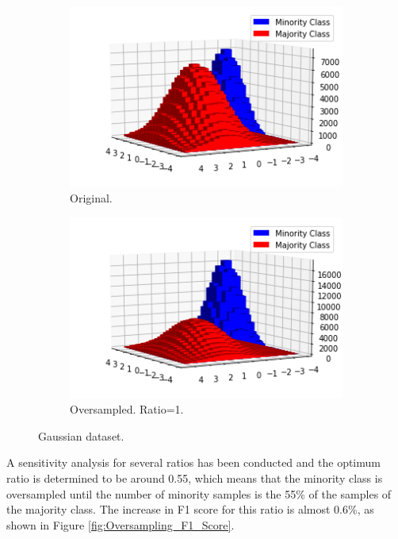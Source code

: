 \documentclass[conference]{IEEEtran}
\begin{document}
	
		\begin{figure}[h]
		\centering
		\begin{subfigure}[h]{0.24\textwidth}
			\centering
			\includegraphics[width=\textwidth]{Oversampling_2D_OriginalDataset}
			\caption{Original.}
			\label{fig:Oversampling_2D_OriginalDataset}
		\end{subfigure}
		\hfill
		\begin{subfigure}[h]{0.24\textwidth}
			\centering
			\includegraphics[width=\textwidth]{Oversampling_2D_OversampledDataset}
			\caption{Oversampled. Ratio=1.}
			\label{fig:Oversampling_2D_OversampledDataset}
		\end{subfigure}
		\caption{Gaussian dataset.}
		\label{fig:Oversampling_2D_OriginalHistograms}
	\end{figure}
	
	A sensitivity analysis for several ratios has been conducted and the optimum ratio is determined to be around 0.55, which means that the minority class is oversampled until the number of minority samples is the 55\% of the samples of the majority class. The increase in F1 score for this ratio is almost 0.6\%, as shown in Figure \ref{fig:Oversampling_F1_Score}.
	
\end{document}
